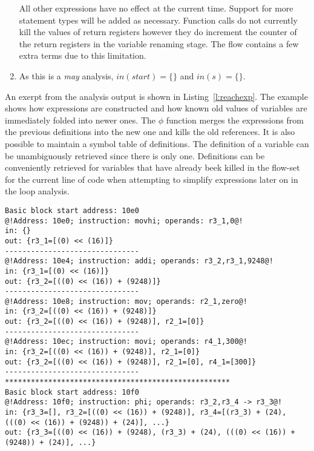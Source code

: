 \begin{enumerate}
  All other expressions have no effect at the current time. Support for more statement types will be added as necessary. Function calls do not currently kill the values of return registers however they do increment the counter of the return registers in the variable renaming stage. The flow contains a few extra terms due to this limitation.
  
  \item As this is a \textit{may} analysis, $in(start)=\{\}$ and $in(s)=\{\}$. 
\end{enumerate}

An exerpt from the analysis output is shown in Listing~\ref{l:reachexp}. The example shows how expressions are constructed and how known old values of variables are immediately folded into newer ones. The $\phi$ function merges the expressions from the previous definitions into the new one and kills the old references. It is also possible to maintain a symbol table of definitions. The definition of a variable can be unambiguously retrieved since there is only one. Definitions can be conveniently retrieved for variables that have already beek killed in the flow-set for the current line of code when attempting to simplify expressions later on in the loop analysis.

\begin{lstlisting}[caption={Example reaching expression analysis},label=l:reachexp,captionpos=t]
Basic block start address: 10e0
@!Address: 10e0; instruction: movhi; operands: r3_1,0@!
in: {}
out: {r3_1=[(0) << (16)]}
-------------------------------
@!Address: 10e4; instruction: addi; operands: r3_2,r3_1,9248@!
in: {r3_1=[(0) << (16)]}
out: {r3_2=[((0) << (16)) + (9248)]}
-------------------------------
@!Address: 10e8; instruction: mov; operands: r2_1,zero@!
in: {r3_2=[((0) << (16)) + (9248)]}
out: {r3_2=[((0) << (16)) + (9248)], r2_1=[0]}
-------------------------------
@!Address: 10ec; instruction: movi; operands: r4_1,300@!
in: {r3_2=[((0) << (16)) + (9248)], r2_1=[0]}
out: {r3_2=[((0) << (16)) + (9248)], r2_1=[0], r4_1=[300]}
-------------------------------
****************************************************
Basic block start address: 10f0
@!Address: 10f0; instruction: phi; operands: r3_2,r3_4 -> r3_3@!
in: {r3_3=[], r3_2=[((0) << (16)) + (9248)], r3_4=[(r3_3) + (24), (((0) << (16)) + (9248)) + (24)], ...}
out: {r3_3=[((0) << (16)) + (9248), (r3_3) + (24), (((0) << (16)) + (9248)) + (24)], ...}

\end{lstlisting} 

